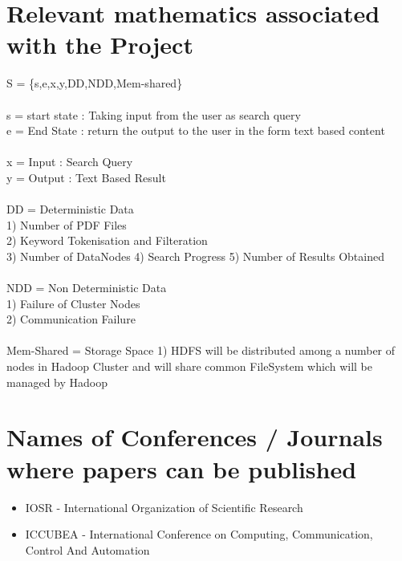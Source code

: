 \documentclass[oneside,a4paper,12pt]{report}
\begin{document}
\section{Relevant mathematics associated with the Project}
\noindent
S = \{s,e,x,y,DD,NDD,Mem-shared\} \\\\
s = start state : Taking input from the user as search query \\
e = End State : return the output to the user in the form text based content \\\\
x = Input : Search Query \\
y = Output : Text Based Result \\\\
DD = Deterministic Data \\
1) Number of PDF Files \\
2) Keyword Tokenisation and Filteration \\
3) Number of DataNodes 
4) Search Progress 
5) Number of Results Obtained \\\\
NDD = Non Deterministic Data \\
1) Failure of Cluster Nodes \\
2) Communication Failure  \\\\
Mem-Shared = Storage Space 
1) HDFS will be distributed among a number of nodes in Hadoop Cluster and will share common FileSystem which will be managed by Hadoop \\


\section{Names of Conferences / Journals where papers can be published}
\begin{itemize}
\item IOSR - International Organization of Scientific Research
\item ICCUBEA - International Conference on Computing, Communication, Control And Automation
\end{itemize} 
\end{document}
